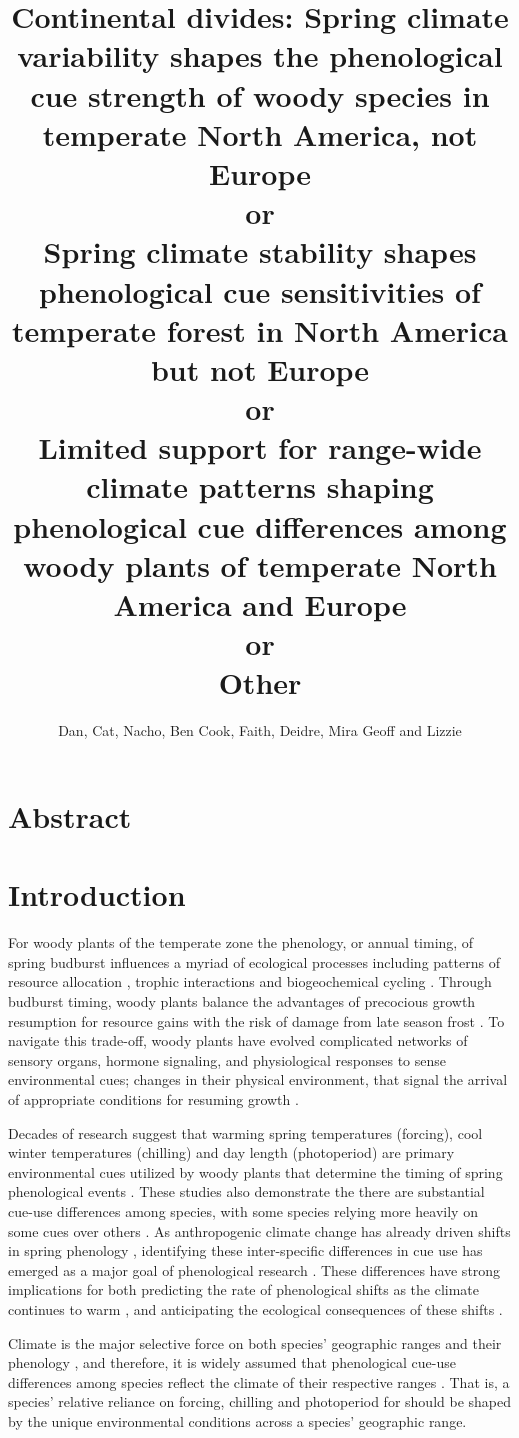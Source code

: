 \documentclass[12pt]{article}\usepackage[]{graphicx}\usepackage[]{color}
\title{Continental divides: Spring climate variability shapes the phenological cue strength of woody species in temperate North America, not Europe\\ or\\
Spring climate stability shapes phenological cue sensitivities of temperate forest in North America but not Europe\\ or\\
Limited support for range-wide climate patterns shaping phenological cue differences among woody plants of temperate North America and Europe \\or\\
Other
}
\author{Dan, Cat, Nacho, Ben Cook, Faith, Deidre, Mira Geoff and Lizzie}
\begin{document}
\maketitle

\section*{Abstract}
\section*{Introduction}
For woody plants of the temperate zone the phenology, or annual timing, of spring budburst influences a myriad of ecological processes including patterns of resource allocation \citep{Seiwa:1991vr}, trophic interactions \citep{Memmott2007} and biogeochemical cycling \citep{Piao2007}.
 Through budburst timing, woody plants balance the advantages of precocious growth resumption for resource gains with the risk of damage from late season frost \citep{Savage:2013aa}. To navigate this trade-off, woody plants have evolved complicated networks of sensory organs, hormone signaling, and physiological responses to sense environmental cues; changes in their physical environment, that signal the arrival of appropriate conditions for resuming growth \citep{Visser2010,}. %

Decades of research suggest that warming spring temperatures (forcing), cool winter temperatures (chilling) and day length (photoperiod) are primary environmental cues utilized by woody plants that determine the timing of spring phenological events \cite{Ettinger:2020aa,Forrest2010}. These studies also demonstrate the there are substantial cue-use differences among species, with some species relying more heavily on some cues over others \citep{Laube:2014aa,}. As anthropogenic climate change has already driven shifts in spring phenology \citep{Menzel2006}, identifying these inter-specific differences in cue use has emerged as a major goal of phenological research \citep{Chuine2002}. These differences have strong implications for both predicting the rate of phenological shifts as the climate continues to warm \citep{}, and anticipating the ecological consequences of these shifts \citep{Cleland2012}.

Climate is the major selective force on both species' geographic ranges \citep{Morin:2011aa} and their phenology \citep{Savage:2013aa}, and therefore, it is widely assumed that phenological cue-use differences among species reflect the climate of their respective ranges \citep{Zohner:2017aa,Silvestro:2019wa}. That is, a species' relative reliance on forcing, chilling and photoperiod for should be shaped by the unique environmental conditions across a species' geographic range.
\end{document}
